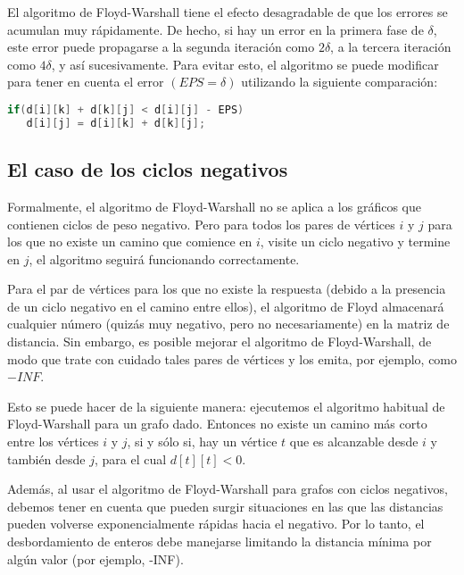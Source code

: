 El algoritmo de Floyd-Warshall tiene el efecto desagradable de que los errores se acumulan muy rápidamente. De hecho, si hay un error en la primera fase de $\delta$, este error puede propagarse a la segunda iteración como $2\delta$, a la tercera iteración como $4\delta$, y así sucesivamente.
Para evitar esto, el algoritmo se puede modificar para tener en cuenta el error $(EPS = \delta)$ utilizando la siguiente comparación:

\begin{lstlisting}[language=C++]
if(d[i][k] + d[k][j] < d[i][j] - EPS)
   d[i][j] = d[i][k] + d[k][j];
\end{lstlisting}

\subsection{El caso de los ciclos negativos}
Formalmente, el algoritmo de Floyd-Warshall no se aplica a los gráficos que contienen ciclos de peso negativo. Pero para todos los pares de vértices $i$ y $j$ para los que no existe un camino que comience en $i$, visite un ciclo negativo y termine en $j$, el algoritmo seguirá funcionando correctamente.

Para el par de vértices para los que no existe la respuesta (debido a la presencia de un ciclo negativo en el camino entre ellos), el algoritmo de Floyd almacenará cualquier número (quizás muy negativo, pero no necesariamente) en la matriz de distancia. Sin embargo, es posible mejorar el algoritmo de Floyd-Warshall, de modo que trate con cuidado tales pares de vértices y los emita, por ejemplo, como $-INF$.

Esto se puede hacer de la siguiente manera: ejecutemos el algoritmo habitual de Floyd-Warshall para un grafo dado. Entonces no existe un camino más corto entre los vértices $i$ y $j$, si y sólo si, hay un vértice $t$ que es alcanzable desde $i$ y también desde $j$, para el cual $d[t][t]<0$.

Además, al usar el algoritmo de Floyd-Warshall para grafos con ciclos negativos, debemos tener en cuenta que pueden surgir situaciones en las que las distancias pueden volverse exponencialmente rápidas hacia el negativo. Por lo tanto, el desbordamiento de enteros debe manejarse limitando la distancia mínima por algún valor (por ejemplo, -INF).
